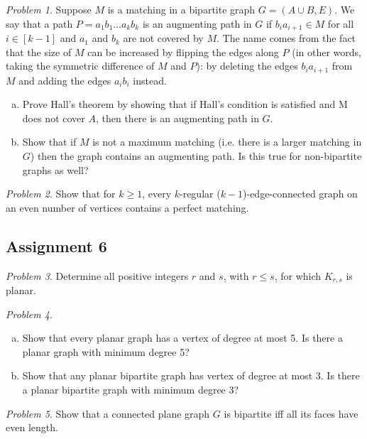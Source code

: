 \documentclass[11pt, fleqn, a4paper, landscape]{article}
\theoremstyle{plain} %
\theoremstyle{remark} %
\newtheorem{problem}{Problem}
\theoremstyle{definition} %
\begin{document}
\begin{multicols}{3}
\begin{problem}
Suppose $M$ is a matching in a bipartite graph $G = (A\cup B,E)$. We say that a path $P = a_1b_1\dots a_kb_k$ is an augmenting path in $G$ if $b_ia_{i+1}\in M$ for all $i\in [k - 1]$ and $a_1$ and $b_k$ are not covered by $M$. The name comes from the fact that the size of $M$ can be increased
by 
flipping the edges along $P$ (in other words, taking the symmetric difference of $M$ and $P$): by deleting the edges $b_ia_{i+1}$ from $M$ and adding the edges $a_ib_i$ instead.
\begin{enumerate}[(a)]
\item Prove Hall's theorem by showing that if Hall's condition is satisfied and M does not cover $A$, then there is an augmenting path in $G$.
\item Show that if $M$ is not a maximum matching (i.e. there is a larger matching in $G$) then the graph contains an augmenting path. Is this true for non-bipartite graphs as well?
\end{enumerate}
\end{problem}

\begin{problem}
Show that for $k\ge 1$, every $k$-regular ($k- 1$)-edge-connected graph on an even number of vertices contains a perfect matching.
\end{problem}

\subsection{Assignment 6}

\begin{problem}
Determine all positive integers $r$ and $s$, with $r \le s$, for which $K_{r,s}$ is planar.
\end{problem}

\begin{problem}
\begin{enumerate}[(a)]
\item Show that every planar graph has a vertex of degree at most 5. Is there a planar graph with minimum degree 5?
\item Show that any planar bipartite graph has vertex of degree at most 3. Is there a planar bipartite graph with minimum degree 3?
\end{enumerate}
\end{problem}

\begin{problem}
Show that a connected plane graph $G$ is bipartite iff all its faces have even length.
\end{problem}


\end{multicols}
\end{document}
